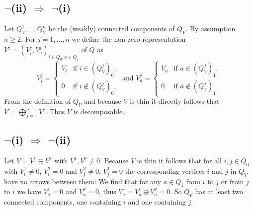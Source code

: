 \documentclass[a4paper,10pt]{article}
\theoremstyle{definition}
\begin{document}
\section{}


\subsection*{$\neg$(ii) $\Rightarrow$ $\neg$(i)}
Let $Q_V^1, \ldots, Q_V^n$ be the (weakly) connected components of $Q_V$. By assumption $n \geq 2$. For $j=1,\ldots,n$ we define the non-zero representation $V^j = (V^j_i, V^j_a)_{i \in Q_0, a \in Q_1}$ of $Q$ as
\[
 V^j_i =
 \begin{cases}
  V_i & \text{if } i \in (Q^j_V)_0, \\
    0 & \text{if } i \not\in (Q^j_V)_0,
 \end{cases}
 \text{ and }
 V^j_a =
 \begin{cases}
  V_a & \text{if } a \in (Q^j_V)_1, \\
    0 & \text{if } a \not\in (Q^j_V)_1.
 \end{cases}
\]
From the definition of $Q_V$ and because $V$ is thin it directly follows that $V = \bigoplus_{j=1}^n V^j$. Thus $V$ is decomposable.


\subsection*{$\neg$(i) $\Rightarrow$ $\neg$(ii)}
Let $V = V^1 \oplus V^2$ with $V^1, V^2 \neq 0$. Because $V$ is thin it follows that for all $i,j \in Q_0$ with $V^1_i \neq 0$, $V^2_i = 0$ and $V^2_j \neq 0$, $V^1_j = 0$ the corresponding vertices $i$ and $j$ in $Q_V$ have no arrows between them: We find that for any $a \in Q_1$ from $i$ to $j$ or from $j$ to $i$ we have $V^1_a = 0$ and $V^2_a = 0$, thus $V_a = V^1_a \oplus V^2_a = 0$. So $Q_V$ has at least two connected components, one containing $i$ and one containing $j$.
\end{document}
